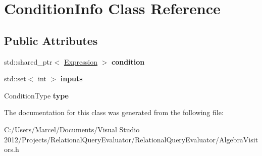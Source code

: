 \hypertarget{class_condition_info}{\section{Condition\+Info Class Reference}
\label{class_condition_info}
}
\subsection*{Public Attributes}
\begin{DoxyCompactItemize}
\item 
\hypertarget{class_condition_info_a57923bd70f56a79ca3ae8d09bb14f550}{std\+::shared\+\_\+ptr$<$ \hyperlink{class_expression}{Expression} $>$ {\bfseries condition}}\label{class_condition_info_a57923bd70f56a79ca3ae8d09bb14f550}

\item 
\hypertarget{class_condition_info_ab800ad40c4040827cd93acc048863213}{std\+::set$<$ int $>$ {\bfseries inputs}}\label{class_condition_info_ab800ad40c4040827cd93acc048863213}

\item 
\hypertarget{class_condition_info_a8ceacc67eb6d52679a9541764fd8b7d6}{Condition\+Type {\bfseries type}}\label{class_condition_info_a8ceacc67eb6d52679a9541764fd8b7d6}

\end{DoxyCompactItemize}


The documentation for this class was generated from the following file\+:\begin{DoxyCompactItemize}
\item 
C\+:/\+Users/\+Marcel/\+Documents/\+Visual Studio 2012/\+Projects/\+Relational\+Query\+Evaluator/\+Relational\+Query\+Evaluator/Algebra\+Visitors.\+h\end{DoxyCompactItemize}
